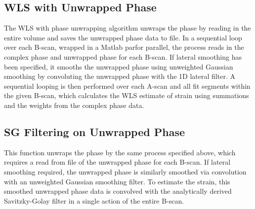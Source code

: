 \subsection{WLS with Unwrapped Phase}
The WLS with phase unwrapping algorithm unwraps the phase by reading in the entire volume and saves the unwrapped phase data to file. In a sequential loop over each B-scan, wrapped in a Matlab parfor parallel, the process reads in the complex phase and unwrapped phase for each B-scan. If lateral smoothing has been specified, it smooths the unwrapped phase using unweighted Gaussian smoothing by convoluting the unwrapped phase with the 1D lateral filter. A sequential looping is then performed over each A-scan and all fit segments within the given B-scan, which calculates the WLS estimate of strain using summations and the weights from the complex phase data.

\subsection{SG Filtering on Unwrapped Phase}
This function unwraps the phase by the same process specified above, which requires a read from file of the unwrapped phase for each B-scan. If lateral smoothing required, the unwrapped phase is similarly smoothed via convolution with an unweighted Gaussian smoothing filter. To estimate the strain, this smoothed unwrapped phase data is convolved with the analytically derived Savitzky-Golay filter in a single action of the entire B-scan.

